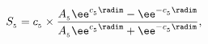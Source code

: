 \begin{equation}
S_{_5} = c_{_5} \times {A_{_5} \ee^{c_{_5} \radim} -
\ee^{-c_{_5} \radim} \over {A_{_5} \ee^{c_{_5} \radim} + \ee^{-c_{_5}
\radim}}},
\label{sol5}
\end{equation}

